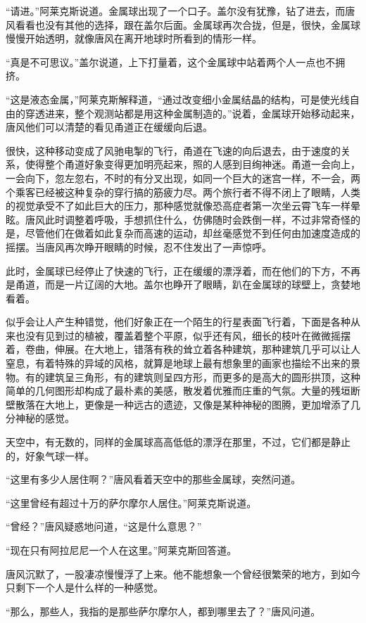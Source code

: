 “请进。”阿莱克斯说道。金属球出现了一个口子。盖尔没有犹豫，钻了进去，而唐风看看也没有其他的选择，跟在盖尔后面。金属球再次合拢，但是，很快，金属球慢慢开始透明，就像唐风在离开地球时所看到的情形一样。

“真是不可思议。”盖尔说道，上下打量着，这个金属球中站着两个人一点也不拥挤。

“这是液态金属，”阿莱克斯解释道，“通过改变细小金属结晶的结构，可是使光线自由的穿透进来，整个观测站都是用这种金属制造的。”说着，金属球开始移动起来，唐风他们可以清楚的看见甬道正在缓缓向后退。

很快，这种移动变成了风驰电掣的飞行，甬道在飞速的向后退去，由于速度的关系，使得整个甬道好象变得更加明亮起来，照的人感到目绚神迷。甬道一会向上，一会向下，忽左忽右，不时的有分叉出现，如同一个巨大的迷宫一样，不一会，两个乘客已经被这种复杂的穿行搞的筋疲力尽。两个旅行者不得不闭上了眼睛，人类的视觉承受不了如此巨大的压力，那种感觉就像恐高症者第一次坐云霄飞车一样晕眩。唐风此时调整着呼吸，手想抓住什么，仿佛随时会跌倒一样，不过非常奇怪的是，尽管他们在做着如此复杂而高速的运动，却丝毫感觉不到任何由加速度造成的摇摆。当唐风再次睁开眼睛的时候，忍不住发出了一声惊呼。

此时，金属球已经停止了快速的飞行，正在缓缓的漂浮着，而在他们的下方，不再是甬道，而是一片辽阔的大地。盖尔也睁开了眼睛，趴在金属球的球壁上，贪婪地看着。

似乎会让人产生种错觉，他们好象正在一个陌生的行星表面飞行着，下面是各种从来也没有见到过的植被，覆盖着整个平原，似乎还有风，细长的枝叶在微微摇摆着，卷曲，伸展。在大地上，错落有秩的耸立着各种建筑，那种建筑几乎可以让人窒息，有着特殊的异域的风格，就算是地球上最有想象里的画家也描绘不出来的景物。有的建筑呈三角形，有的建筑则呈四方形，而更多的是高大的圆形拱顶，这种简单的几何图形却构成了最朴素的美感，散发着优雅而庄重的气氛。大量的残垣断壁散落在大地上，更像是一种远古的遗迹，又像是某种神秘的图腾，更加增添了几分神秘的感觉。

天空中，有无数的，同样的金属球高高低低的漂浮在那里，不过，它们都是静止的，好象气球一样。

“这里有多少人居住啊？”唐风看着天空中的那些金属球，突然问道。

“这里曾经有超过十万的萨尔摩尔人居住。”阿莱克斯说道。

“曾经？”唐风疑惑地问道，“这是什么意思？”

“现在只有阿拉尼尼一个人在这里。”阿莱克斯回答道。

唐风沉默了，一股凄凉慢慢浮了上来。他不能想象一个曾经很繁荣的地方，到如今只剩下一个人是什么样的一种感觉。

“那么，那些人，我指的是那些萨尔摩尔人，都到哪里去了？”唐风问道。

